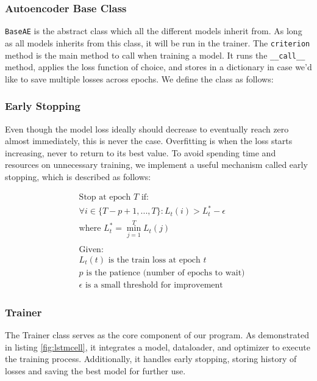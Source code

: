 \subsubsection{Autoencoder Base Class}

\lstinline{BaseAE} is the abstract class which all the different models inherit from. As long as all models inherits from this class, it will be run in the trainer. The \lstinline{criterion} method is the main method to call when training a model. It runs the \lstinline{__call__} method, applies the loss function of choice, and stores in a dictionary in case we'd like to save multiple losses across epochs. We define the class as follows:



\subsubsection{Early Stopping}

Even though the model loss ideally should decrease to eventually reach zero almost immediately, this is never the case. Overfitting is when the loss starts increasing, never to return to its best value. To avoid spending time and resources on unnecessary training, we implement a useful mechanism called early stopping, which is described as follows:


\begin{align*}
&\text{Stop at epoch } T \text{ if:} \\
&\forall i \in \{T-p+1, ..., T\}: L_t(i) > L_t^* - \epsilon \\
&\text{where } L_t^* = \min_{j=1}^{T} L_t(j) \\
\\
&\text{Given:} \\
&L_t(t) \text{ is the train loss at epoch } t \\
&p \text{ is the patience (number of epochs to wait)} \\
&\epsilon \text{ is a small threshold for improvement}
\end{align*}

\subsubsection{Trainer}

The Trainer class serves as the core component of our program. As demonstrated in listing \ref{fig:lstmcell}, it integrates a model, dataloader, and optimizer to execute the training process. Additionally, it handles early stopping, storing history of losses and saving the best model for further use.

